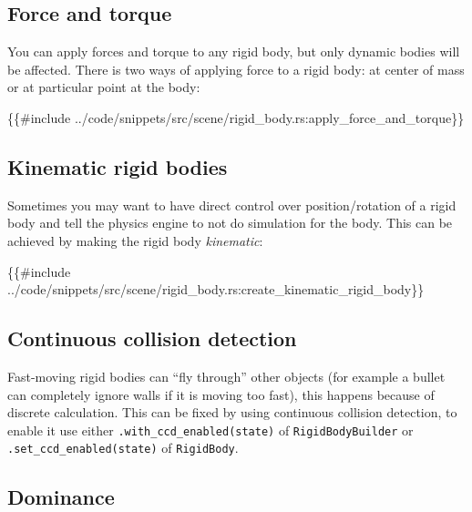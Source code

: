 \documentclass[
]{book}
\newenvironment{Shaded}{\begin{snugshade}}{\end{snugshade}}
\newcommand{\NormalTok}[1]{#1}
\theoremstyle{definition}
\theoremstyle{definition}
\theoremstyle{definition}
\theoremstyle{definition}
\theoremstyle{remark}
\begin{document}
\subsection{Force and torque}\label{force-and-torque}

You can apply forces and torque to any rigid body, but only dynamic bodies will be affected. There is two ways of applying force to a rigid body: at center of mass or at particular point at the body:

\begin{Shaded}
\begin{Highlighting}[]
\NormalTok{\{\{\#include ../code/snippets/src/scene/rigid\_body.rs:apply\_force\_and\_torque\}\}}
\end{Highlighting}
\end{Shaded}

\subsection{Kinematic rigid bodies}\label{kinematic-rigid-bodies}

Sometimes you may want to have direct control over position/rotation of a rigid body and tell the physics engine to not do simulation for the body. This can be achieved by making the rigid body \emph{kinematic}:

\begin{Shaded}
\begin{Highlighting}[]
\NormalTok{\{\{\#include ../code/snippets/src/scene/rigid\_body.rs:create\_kinematic\_rigid\_body\}\}}
\end{Highlighting}
\end{Shaded}

\subsection{Continuous collision detection}\label{continuous-collision-detection}

Fast-moving rigid bodies can ``fly through'' other objects (for example a bullet can completely ignore walls if it is moving too fast), this happens because of discrete calculation. This can be fixed by using continuous collision detection, to enable it use either \texttt{.with\_ccd\_enabled(state)} of \texttt{RigidBodyBuilder} or \texttt{.set\_ccd\_enabled(state)} of \texttt{RigidBody}.

\subsection{Dominance}\label{dominance}
\end{document}
